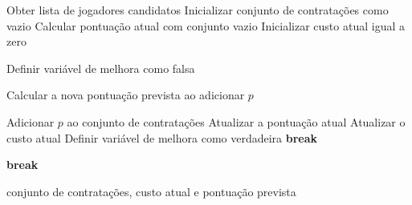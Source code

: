 \begin{algorithm}[H]
\caption{Algoritmo Guloso com estratégia First Improvement}
\label{alg:guloso_first}
\begin{algorithmic}

\State Obter lista de jogadores candidatos
\State Inicializar conjunto de contratações como vazio
\State Calcular pontuação atual com conjunto vazio
\State Inicializar custo atual igual a zero

    \State Definir variável de melhora como falsa

            \State Calcular a nova pontuação prevista ao adicionar $p$

                \State Adicionar $p$ ao conjunto de contratações
                \State Atualizar a pontuação atual
                \State Atualizar o custo atual
                \State Definir variável de melhora como verdadeira
                \State \textbf{break} 
            \EndIf
        \EndIf
    \EndFor

        \State \textbf{break}
    \EndIf
\EndWhile

\State \Return conjunto de contratações, custo atual e pontuação prevista

\end{algorithmic}
\end{algorithm}